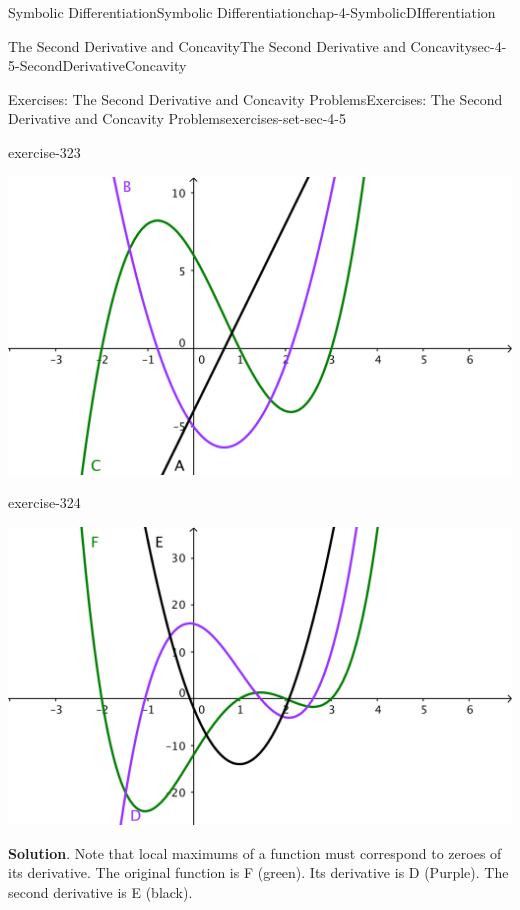 \documentclass[oneside,10pt,]{book}
\numberwithin{equation}{section}
\begin{document}
\begin{chapterptx}{Symbolic Differentiation}{}{Symbolic Differentiation}{}{}{chap-4-SymbolicDIfferentiation}
\begin{sectionptx}{The Second Derivative and Concavity}{}{The Second Derivative and Concavity}{}{}{sec-4-5-SecondDerivativeConcavity}
\begin{exercises-subsection-numberless}{Exercises: The Second Derivative and Concavity Problems}{}{Exercises: The Second Derivative and Concavity Problems}{}{}{exercises-set-sec-4-5}
\begin{exercisegroup}
\begin{divisionexerciseeg}{10}{}{}{exercise-323}
\leavevmode%
\begin{sidebyside}{1}{0.25}{0.25}{0}%
\begin{sbspanel}{0.5}%
\includegraphics[width=1\linewidth]{images/sec4-5-e1.png}
\end{sbspanel}%
\end{sidebyside}%
%
\end{divisionexerciseeg}%
\begin{divisionexerciseeg}{11}{}{}{exercise-324}%
\hypertarget{p-1845}{}%
\leavevmode%
\begin{sidebyside}{1}{0.25}{0.25}{0}%
\begin{sbspanel}{0.5}%
\includegraphics[width=1\linewidth]{images/sec4-5-e2.png}
\end{sbspanel}%
\end{sidebyside}%
%
\par\smallskip%
\noindent\textbf{Solution}.\hypertarget{solution-162}{}\quad%
\hypertarget{p-1846}{}%
Note that local maximums of a function must correspond to zeroes of its derivative.  The original function is F (green).   Its derivative is D (Purple).  The second derivative is E (black).%

\end{divisionexerciseeg}
\end{exercisegroup}
\end{exercises-subsection-numberless}
\end{sectionptx}
\end{chapterptx}
\end{document}
